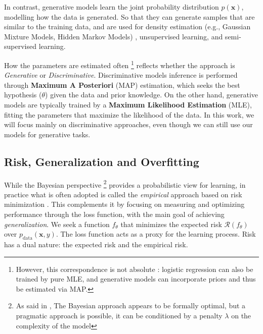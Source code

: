 In contrast, generative models learn the joint probability distribution $p(\mathbf{x})$, modelling how the data is generated. So that they can generate samples that are similar to the training data, and are used for density estimation (e.g., Gaussian Mixture Models, Hidden Markov Models) \cite[Ch. 5.8]{lecun2015deep}, unsupervised learning, and semi-supervised learning.

How the parameters are estimated often \footnote{However, this correspondence is not absolute \cite[p.~312, Ch.~13]{barberBRML2011}: logistic regression
 can also be trained by pure MLE, and generative models can incorporate priors and thus be estimated via MAP.} reflects whether the approach is \textit{Generative} or \textit{Discriminative}.
\newline  
Discriminative models inference is performed through \textbf{Maximum A Posteriori} (MAP) estimation, which seeks the best
hypothesis ($\theta$) given the data and prior knowledge. On the other hand, generative models are typically trained by a \textbf{Maximum Likelihood Estimation} (MLE),
fitting the parameters that maximize the likelihood of the data.\newline
In this work, we will focus mainly on discriminative approaches, even though we can still use our models for generative tasks.
\subsection{Risk, Generalization and Overfitting}

While the Bayesian perspective \footnote{As said in \cite[p.~314, Ch.~13]{barberBRML2011}, 
The Bayesian approach appears to be formally optimal, but a pragmatic approach is possible, 
it can be conditioned by a penalty $\lambda$ on the complexity of the model} provides a probabilistic view for learning,
in practice what is often adopted is called the \textit{empirical} approach based on risk minimization
\cite{Vapnik1998}. This complements it by focusing on measuring and optimizing performance through the loss function,
with the main goal of achieving \textit{generalization}.
We seek a function $f_{\theta}$ that minimizes the expected risk $\mathcal{R}(f_\theta)$ over $p_{\text{data}}(\mathbf{x}, y)$.
The loss function acts as a proxy for the learning process.
Risk has a dual nature: the expected risk and the empirical risk.

